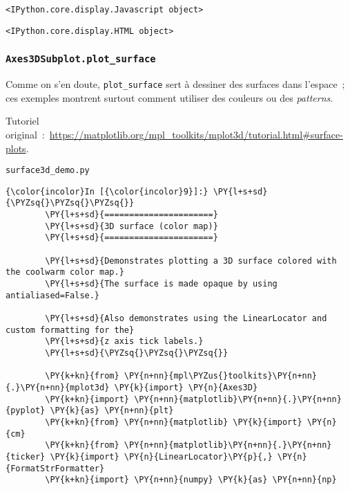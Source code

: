     
    \begin{verbatim}
<IPython.core.display.Javascript object>
    \end{verbatim}

    
    
    \begin{verbatim}
<IPython.core.display.HTML object>
    \end{verbatim}

    
    \hypertarget{axes3dsubplot.plot_surface}{%
\subsubsection{\texorpdfstring{\texttt{Axes3DSubplot.plot\_surface}}{Axes3DSubplot.plot\_surface}}\label{axes3dsubplot.plot_surface}}

    Comme on s'en doute, \texttt{plot\_surface} sert à dessiner des surfaces
dans l'espace~; ces exemples montrent surtout comment utiliser des
couleurs ou des \emph{patterns}.

    Tutoriel
original~:~\url{https://matplotlib.org/mpl_toolkits/mplot3d/tutorial.html\#surface-plots}.

    \texttt{surface3d\_demo.py}

    \begin{Verbatim}[commandchars=\\\{\},frame=single,framerule=0.3mm,rulecolor=\color{cellframecolor}]
{\color{incolor}In [{\color{incolor}9}]:} \PY{l+s+sd}{\PYZsq{}\PYZsq{}\PYZsq{}}
        \PY{l+s+sd}{======================}
        \PY{l+s+sd}{3D surface (color map)}
        \PY{l+s+sd}{======================}
        
        \PY{l+s+sd}{Demonstrates plotting a 3D surface colored with the coolwarm color map.}
        \PY{l+s+sd}{The surface is made opaque by using antialiased=False.}
        
        \PY{l+s+sd}{Also demonstrates using the LinearLocator and custom formatting for the}
        \PY{l+s+sd}{z axis tick labels.}
        \PY{l+s+sd}{\PYZsq{}\PYZsq{}\PYZsq{}}
        
        \PY{k+kn}{from} \PY{n+nn}{mpl\PYZus{}toolkits}\PY{n+nn}{.}\PY{n+nn}{mplot3d} \PY{k}{import} \PY{n}{Axes3D}
        \PY{k+kn}{import} \PY{n+nn}{matplotlib}\PY{n+nn}{.}\PY{n+nn}{pyplot} \PY{k}{as} \PY{n+nn}{plt}
        \PY{k+kn}{from} \PY{n+nn}{matplotlib} \PY{k}{import} \PY{n}{cm}
        \PY{k+kn}{from} \PY{n+nn}{matplotlib}\PY{n+nn}{.}\PY{n+nn}{ticker} \PY{k}{import} \PY{n}{LinearLocator}\PY{p}{,} \PY{n}{FormatStrFormatter}
        \PY{k+kn}{import} \PY{n+nn}{numpy} \PY{k}{as} \PY{n+nn}{np}
\end{Verbatim}


